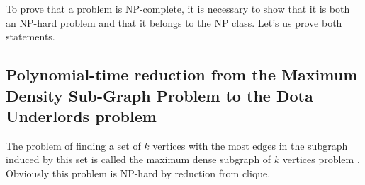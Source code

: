 \documentclass[smallextended]{svjour3}       %
\begin{document}
To prove that a problem is NP-complete, it is necessary to show that it is both an NP-hard problem and that it belongs to the NP class. Let's us prove both statements.

\subsection{Polynomial-time reduction from the Maximum Density Sub-Graph Problem to the Dota Underlords problem}

The problem of finding a set of $k$ vertices with the most edges in the subgraph induced by this set is called the maximum dense subgraph of $k$ vertices problem \cite{kortsarz1993choosing}.  Obviously this problem is NP-hard by reduction from clique. 

\end{document}
